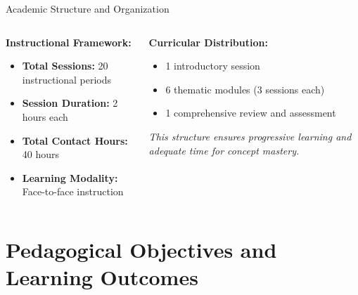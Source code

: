 \documentclass[10pt,aspectratio=169]{beamer}
\newcommand{\highlight}[1]{\textcolor{mLightBrown}{\textbf{#1}}}
\newcommand{\concept}[1]{\textcolor{mDarkTeal}{\textbf{#1}}}
\newcommand{\emphasis}[1]{\textit{#1}}
\begin{document}
\begin{frame}{Academic Structure and Organization}
    \begin{columns}
        \begin{column}{0.5\textwidth}
            \concept{Instructional Framework:}
            \begin{itemize}
                \item \highlight{Total Sessions:} 20 instructional periods
                \item \highlight{Session Duration:} 2 hours each
                \item \highlight{Total Contact Hours:} 40 hours
                \item \highlight{Learning Modality:} Face-to-face instruction
            \end{itemize}
        \end{column}
        \begin{column}{0.5\textwidth}
            \concept{Curricular Distribution:}
            \begin{itemize}
                \item 1 introductory session
                \item 6 thematic modules (3 sessions each)
                \item 1 comprehensive review and assessment
            \end{itemize}
            
            \vspace{0.3cm}
            \emphasis{This structure ensures progressive learning and adequate time for concept mastery.}
        \end{column}
    \end{columns}
\end{frame}

\section{Pedagogical Objectives and Learning Outcomes}
\end{document}
